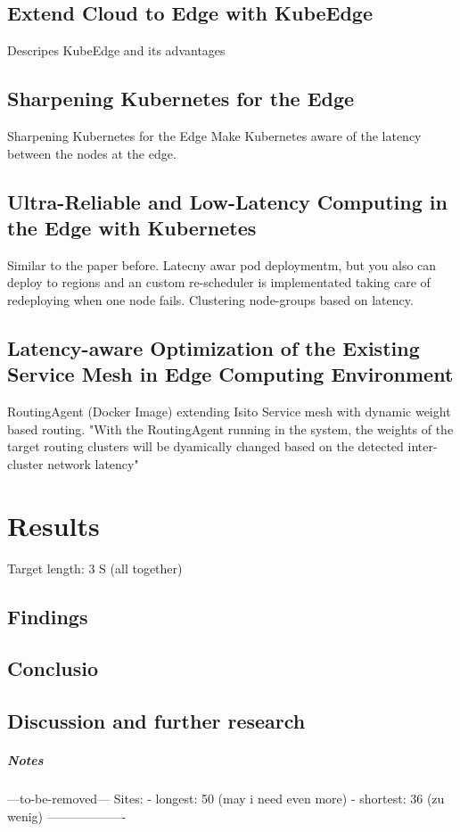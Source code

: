 \documentclass[MSC,Master,english]{twbook}%
\begin{document}
\section{Extend Cloud to Edge with KubeEdge}
Descripes KubeEdge and its advantages
\section{Sharpening Kubernetes for the Edge}
Sharpening Kubernetes for the Edge
Make Kubernetes aware of the latency between the nodes at the edge.
\section{Ultra-Reliable and Low-Latency Computing in the Edge with Kubernetes}
Similar to the paper before. Latecny awar pod deploymentm, but you also can deploy to regions and an custom re-scheduler is implementated taking care of redeploying when one node fails.
Clustering node-groups based on latency.
\section{Latency-aware Optimization of the Existing Service Mesh in Edge Computing Environment}
RoutingAgent (Docker Image) extending Isito Service mesh with dynamic weight based routing.
"With the RoutingAgent running in the system, the weights of the target routing clusters will be dyamically changed based on the detected inter-cluster network latency"

\chapter{Results}
\label{chap:results}

Target length: 3 S (all together)
\section{Findings}
\label{sec:findings}

\section{Conclusio}
\label{sec:conclusio}

\section{Discussion and further research}
\label{sec:discuss}

\paragraph{Notes}
---to-be-removed---
Sites:
- longest: 50 (may i need even more)
- shortest: 36 (zu wenig)
-------------------
\end{document}
